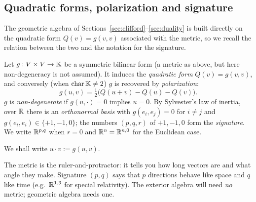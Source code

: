 \subsection{Quadratic forms, polarization and signature}\label{sec:quadform}
The geometric algebra of Sections~\ref{sec:clifford}--\ref{sec:duality} is built directly on the quadratic form $Q(v)=g(v,v)$
associated with the metric, so we recall the relation between the two and the notation for the signature.
\begin{definition}
Let $g:V\times V\to\mathbb{K}$ be a symmetric bilinear form (a metric as above, but here non-degeneracy is not assumed). It induces the
\emph{quadratic form} $Q(v)=g(v,v)$, and conversely (when $\mathrm{char}\,\mathbb{K}\neq2$) $g$ is
recovered by \emph{polarization}:
\begin{equation}\label{eq:polar}
  g(u,v)=\tfrac12\bigl(Q(u+v)-Q(u)-Q(v)\bigr).
\end{equation}
$g$ is \emph{non-degenerate} if $g(u,\cdot)=0$ implies $u=0$. By Sylvester's law of inertia, over
$\mathbb{R}$ there is an \emph{orthonormal basis} with $g(e_i,e_j)=0$ for $i\neq j$ and
$g(e_i,e_i)\in\{+1,-1,0\}$; the numbers $(p,q,r)$ of $+1,-1,0$ form the \emph{signature}.
We write $\mathbb{R}^{p,q}$ when $r=0$ and $\mathbb{R}^n=\mathbb{R}^{n,0}$ for the Euclidean case.
\end{definition}

We shall write $u\cdot v:=g(u,v)$.

\begin{intuition}
The metric is the ruler-and-protractor: it tells you how long vectors are and what angle they make.
Signature $(p,q)$ says that $p$ directions behave like space and $q$ like time (e.g.\ $\mathbb{R}^{1,3}$ for
special relativity). The exterior algebra will need \emph{no} metric; geometric algebra needs one.
\end{intuition}


